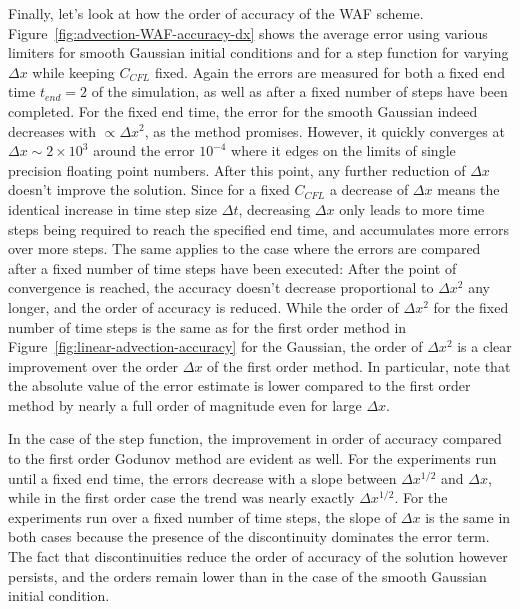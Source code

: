 Finally, let's look at how the order of accuracy of the WAF scheme.
Figure~\ref{fig:advection-WAF-accuracy-dx} shows the average error using various limiters for
smooth Gaussian initial conditions and for a step function for varying $\Delta x$ while keeping
$C_{CFL}$ fixed. Again the errors are measured for both a fixed end time $t_{end} = 2$ of the
simulation, as well as after a fixed number of steps have been completed. For the fixed end time,
the error for the smooth Gaussian indeed decreases with $\propto \Delta x^2$, as the method
promises. However, it quickly converges at $\Delta x \sim 2 \times 10^3$ around the error $10^{-4}$
where it edges on the limits of single precision floating point numbers. After this point, any
further reduction of $\Delta x$ doesn't improve the solution. Since for a fixed $C_{CFL}$ a
decrease of $\Delta x$ means the identical increase in time step size $\Delta t$, decreasing
$\Delta x$ only leads to more time steps being required to reach the specified end time, and
accumulates more errors over more steps. The same applies to the case where the errors are compared
after a fixed number of time steps have been executed: After the point of convergence is reached,
the accuracy doesn't decrease proportional to $\Delta x^2$ any longer, and the order of accuracy is
reduced. While the order of $\Delta x^2$ for the fixed number of time steps is the same as for the
first order method in Figure~\ref{fig:linear-advection-accuracy} for the Gaussian, the order of
$\Delta x^2$ is a clear improvement over the order $\Delta x$ of the first order method. In
particular, note that the absolute value of the error estimate is lower compared to the first order
method by nearly a full order of magnitude even for large $\Delta x$.

In the case of the step function, the improvement in order of accuracy compared to the first order
Godunov method are evident as well. For the experiments run until a fixed end time, the errors
decrease with a slope between $\Delta x^{1/2}$ and $\Delta x$, while in the first order case the
trend was nearly exactly $\Delta x^{1/2}$. For the experiments run over a fixed number of time
steps, the slope of $\Delta x$ is the same in both cases because the presence of the discontinuity
dominates the error term. The fact that discontinuities reduce the order of accuracy of the solution
however persists, and the orders remain lower than in the case of the smooth Gaussian initial
condition.




